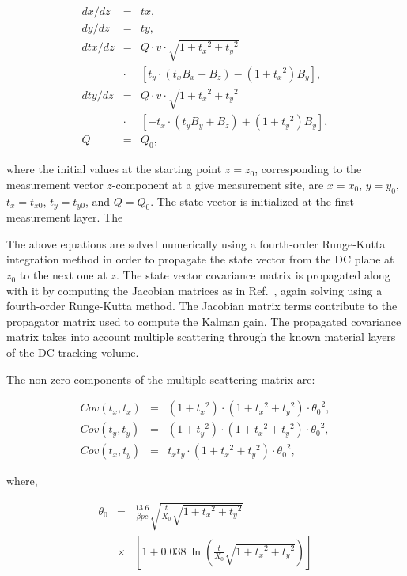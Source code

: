 \begin{eqnarray}
dx/dz  &=& tx, \nonumber \\
dy/dz  &=&  ty, \nonumber \\
dtx/dz &=& Q \cdot v \cdot \sqrt{1 + {t_x}^2 + {t_y}^2}  \nonumber \\
       &\cdot&\!\!\!\!\! [t_y\cdot (t_x B_x + B_z) - (1 + {t_x}^2 ) B_y],  \nonumber \\
dty/dz  &=&  Q \cdot v \cdot \sqrt{1 + {t_x}^2 + {t_y}^2} \nonumber \\
      &\cdot&\!\!\!\!\! [-t_x\cdot (t_y B_y + B_z) + (1 + {t_y}^2 ) B_y], \nonumber \\
Q  &=&  Q_0,
\end{eqnarray}

\noindent
where the initial values at the starting point $z = z_0$, corresponding to the measurement vector $z$-component at a give measurement site,  are $x = x_0$, $y = y_0$, $t_x = t_{x0}$, $t_y = t_{y0}$,
and $Q = Q_0$.  The state vector is initialized at the first measurement layer.  The 

The above equations are solved numerically using a fourth-order Runge-Kutta integration method in order to
propagate the state vector from the DC plane at $z_0$ to the next one at $z$.  The state vector covariance
matrix is propagated along with it by computing the Jacobian matrices as in Ref.~\cite{spiri}, again solving using
a fourth-order Runge-Kutta method. The Jacobian matrix terms contribute to the propagator matrix used to
compute the Kalman gain. The propagated covariance matrix takes into account multiple scattering through the
known material layers of the DC tracking volume.

The non-zero components of the multiple scattering matrix are:

\begin{eqnarray}
Cov (t_x , t_x) &=& (1+{t_x}^2 )\cdot (1+{t_x}^2 + {t_y}^2 )\cdot {\theta_0}^2 , \nonumber \\
Cov (t_y , t_y) &=& (1+{t_y}^2 )\cdot (1+{t_x}^2 + {t_y}^2 )\cdot {\theta_0}^2 , \nonumber \\
Cov (t_x , t_y) &=&  t_x t_y\cdot (1+{t_x}^2 + {t_y}^2 )\cdot {\theta_0}^2 ,
\end{eqnarray}

\noindent
where,

\begin{eqnarray}
  {\theta_0} &=& \frac{13.6}{\beta pc}\sqrt{\frac{t}{X_0}\sqrt{1+{t_x}^2+{t_y}^2}}\\
  &\times&\left[ {1+0.038~\ln \left({\frac{t}{X_0}\sqrt{1+{t_x}^2+{t_y}^2}}\right) }\right] \nonumber
\end{eqnarray}

